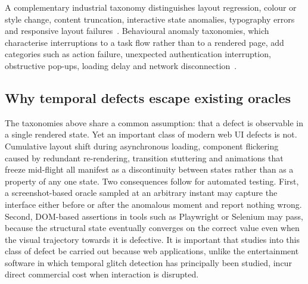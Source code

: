 A complementary industrial taxonomy distinguishes layout regression,
colour or style change, content truncation, interactive state anomalies,
typography errors and responsive layout failures~\citep{vrtatscale}.
Behavioural anomaly taxonomies, which characterise interruptions to a task
flow rather than to a rendered page, add categories such as action
failure, unexpected authentication interruption, obstructive pop-ups,
loading delay and network disconnection~\citep{guirobust}.

\subsection{Why temporal defects escape existing oracles}
\label{sec:temporal-gap}

The taxonomies above share a common assumption: that a defect is
observable in a single rendered state. Yet an important class of modern
web UI defects is not. Cumulative layout shift during asynchronous
loading, component flickering caused by redundant re-rendering,
transition stuttering and animations that freeze mid-flight all manifest
as a discontinuity between states rather than as a property of any one
state. Two consequences follow for automated testing. First, a
screenshot-based oracle sampled at an arbitrary instant may capture the
interface either before or after the anomalous moment and report nothing
wrong. Second, DOM-based assertions in tools such as Playwright or
Selenium may pass, because the structural state eventually converges on
the correct value even when the visual trajectory towards it is defective.
It is important that studies into this class of defect be carried out
because web applications, unlike the entertainment software in which
temporal glitch detection has principally been studied, incur direct
commercial cost when interaction is disrupted.


